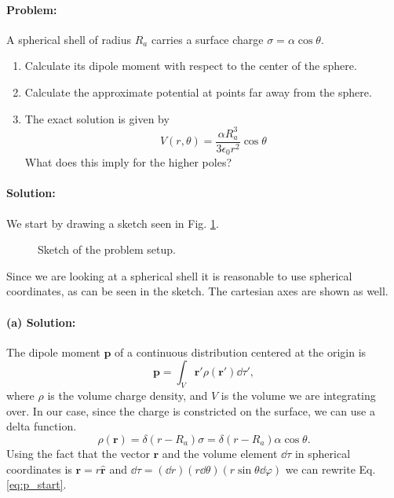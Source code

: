 \paragraph{Problem:} A spherical shell of radius $R_a$ carries a surface charge $\sigma = \alpha \cos\theta$.
\begin{enumerate}[label=(\alph*)]
    \item Calculate its dipole moment with respect to the center of the sphere.
    \item Calculate the approximate potential at points far away from the sphere.
    \item The exact solution is given by
            \begin{equation}
                V(r,\theta) = \frac{\alpha R_a^3}{3\epsilon_0 r^2} \cos\theta
            \end{equation}
            What does this imply for the higher poles?
\end{enumerate}

\paragraph{Solution:} We start by drawing a sketch seen in Fig. \ref{fig:sketch}.

\begin{figure}[H]
    \centering\hspace*{2.3cm}
    
    \caption{Sketch of the problem setup.}
    \label{fig:sketch}
\end{figure}

Since we are looking at a spherical shell it is reasonable to use spherical coordinates, as can be seen in the sketch. The cartesian axes are shown as well. 

\paragraph{(a) Solution:} The dipole moment $\mathbf{p}$ of a continuous distribution centered at the origin is 
\begin{equation}
    \mathbf{p} = \int_V \mathbf{r}' \rho(\mathbf{r}')\dd \tau',\label{eq:p_start}
\end{equation}
where $\rho$ is the volume charge density, and $V$ is the volume we are integrating over. In our case, since the charge is constricted on the surface, we can use a delta function.
\begin{equation}
    \rho(\mathbf{r}) = \delta(r-R_a)\sigma = \delta(r-R_a)\alpha\cos\theta.
\end{equation}
Using the fact that the vector $\mathbf{r}$ and the volume element $\dd \tau$ in spherical coordinates is $\mathbf{r} = r\mathbf{\hat{r}}$ and $\dd \tau = (\dd r)(r \dd \theta)(r \sin\theta \dd\varphi)$ we can rewrite Eq. \eqref{eq:p_start}.